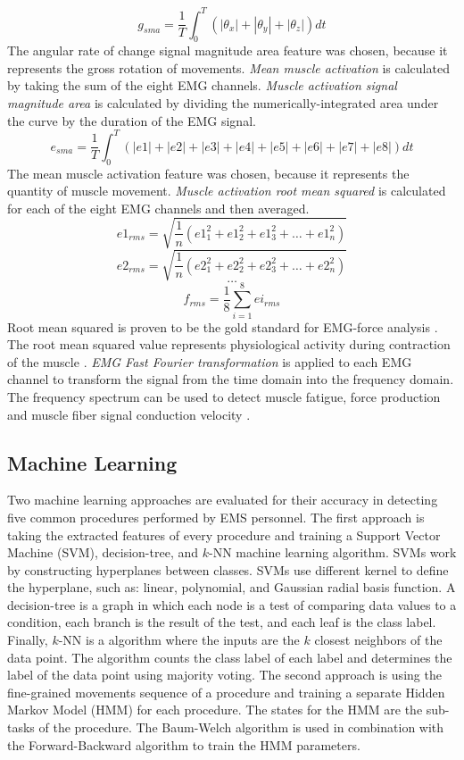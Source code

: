 $$ g_{sma} = \frac{1}{T}\int_{0}^{T}(|\theta_x|+|\theta_y|+|\theta_z|)dt$$
The angular rate of change signal magnitude area feature was chosen, because it represents the gross rotation of movements.
\emph{Mean muscle activation} is calculated by taking the sum of the eight EMG channels. \emph{Muscle activation signal magnitude area} is calculated by dividing the numerically-integrated area under the curve by the duration of the EMG signal.
$$ e_{sma} = \frac{1}{T}\int_{0}^{T}(|e1|+|e2|+|e3|+|e4|+|e5|+|e6|+|e7|+|e8|)dt$$
The mean muscle activation feature was chosen, because it represents the quantity of muscle movement.
\emph{Muscle activation root mean squared} is calculated for each of the eight EMG channels and then averaged.
$$ e1_{rms} = \sqrt{\frac{1}{n}(e1_1^2+e1_2^2+e1_3^2+\dots+e1_n^2)} $$
$$ e2_{rms} = \sqrt{\frac{1}{n}(e2_1^2+e2_2^2+e2_3^2+\dots+e2_n^2)} $$
$$ \dots $$
$$ f_{rms} = \frac{1}{8}\sum_{i=1}^{8}ei_{rms} $$
Root mean squared is proven to be the gold standard for EMG-force analysis \cite{KALLENBERG2008780}. The root mean squared value represents physiological activity during contraction of the muscle \cite{Totty2017}.
\emph{EMG Fast Fourier transformation} is applied to each EMG channel to transform the signal from the time domain into the frequency domain. The frequency spectrum can be used to detect muscle fatigue, force production and muscle fiber signal conduction velocity \cite{Gler2005}.
\subsection{Machine Learning}
\label{sec:Approach:Machine-Learning}
Two machine learning approaches are evaluated for their accuracy in detecting five common procedures performed by EMS personnel. The first approach is taking the extracted features of every procedure and training a Support Vector Machine (SVM), decision-tree, and $k$-NN machine learning algorithm. SVMs work by constructing hyperplanes between classes. SVMs use different kernel to define the hyperplane, such as: linear, polynomial, and Gaussian radial basis function. A decision-tree is a graph in which each node is a test of comparing data values to a condition, each branch is the result of the test, and each leaf is the class label. Finally, $k$-NN is a algorithm where the inputs are the $k$ closest neighbors of the data point. The algorithm counts the class label of each label and determines the label of the data point using majority voting. The second approach is using the fine-grained movements sequence of a procedure and training a separate Hidden Markov Model (HMM) for each procedure. The states for the HMM are the sub-tasks of the procedure. The Baum-Welch algorithm is used in combination with the Forward-Backward algorithm to train the HMM parameters.

